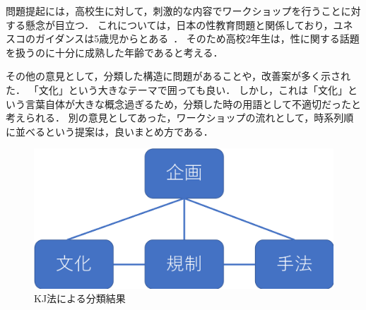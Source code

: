 \documentclass[pdflatex,ja=standard]{bxjsarticle}
\begin{document}
問題提起には，高校生に対して，刺激的な内容でワークショップを行うことに対する懸念が目立つ．
これについては，日本の性教育問題と関係しており，ユネスコのガイダンスは5歳児からとある~\cite{40021294461}．
そのため高校2年生は，性に関する話題を扱うのに十分に成熟した年齢であると考える．

その他の意見として，分類した構造に問題があることや，改善案が多く示された．
「文化」という大きなテーマで囲っても良い．
しかし，これは「文化」という言葉自体が大きな概念過ぎるため，分類した時の用語として不適切だったと考えられる．
別の意見としてあった，ワークショップの流れとして，時系列順に並べるという提案は，良いまとめ方である．

\begin{figure}[htb]
\begin{center}
    \includegraphics[width=14cm]{figs/propose.png}
\end{center}
\caption{KJ法による分類結果}
\label{fig:propose}
\end{figure}




\end{document}
